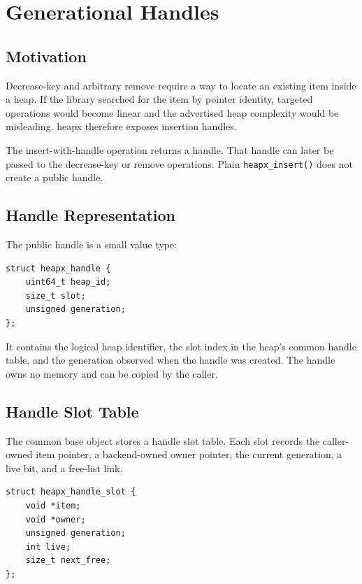 \chapter{Generational Handles}
\label{chap:handles}

\section{Motivation}

Decrease-key and arbitrary remove require a way to locate an existing item inside a heap.
If the library searched for the item by pointer identity, targeted operations would become linear and the advertised heap complexity would be misleading.
heapx therefore exposes insertion handles.

The insert-with-handle operation returns a handle.
That handle can later be passed to the decrease-key or remove operations.
Plain \texttt{heapx\_insert()} does not create a public handle.

\section{Handle Representation}

The public handle is a small value type:

\begin{lstlisting}[style=cstyle, caption={Public handle representation.}]
struct heapx_handle {
    uint64_t heap_id;
    size_t slot;
    unsigned generation;
};
\end{lstlisting}

It contains the logical heap identifier, the slot index in the heap's common handle table, and the generation observed when the handle was created.
The handle owns no memory and can be copied by the caller.

\section{Handle Slot Table}

The common base object stores a handle slot table.
Each slot records the caller-owned item pointer, a backend-owned owner pointer, the current generation, a live bit, and a free-list link.

\begin{lstlisting}[style=cstyle, caption={Internal handle slot.}]
struct heapx_handle_slot {
    void *item;
    void *owner;
    unsigned generation;
    int live;
    size_t next_free;
};
\end{lstlisting}

